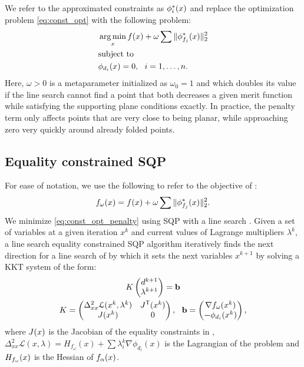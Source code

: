 We refer to the approximated constraints as $\phi^*_i(x)$ and replace the optimization problem \eqref{eq:const_opt} with the following problem:
\begin{equation} \label{eq:const_opt_penalty}
\begin{aligned}
& \operatorname*{arg\,min}_x f(x) + \omega \sum \|\phi^*_{f_j}(x)\|_2^2 \\
& \textrm{subject to} \\
& \phi_{d_i}(x) = 0, \ \  i = 1, \ldots, n. \\ 
\end{aligned}
\end{equation}
Here, $\omega > 0$ is a metaparameter initialized as $\omega_0 = 1$ and which doubles its value if the line search cannot find a point that both decreases a given merit function while satisfying the supporting plane conditions exactly. In practice, the penalty term only affects points that are very close to being planar, while approaching zero very quickly around already folded points.

\subsection{Equality constrained SQP}
For ease of notation, we use the following to refer to the objective of :
\begin{equation}
f_\omega(x) = f(x) + \omega \sum \|\phi^*_{f_j}(x)\|_2^2.
\end{equation}
We minimize \eqref{eq:const_opt_penalty} using SQP with a line search \cite{nocedal}. Given a set of variables at a given iteration $x^k$ and current values of Lagrange multipliers $\lambda^k$, a line search equality constrained SQP algorithm iteratively finds the next direction for a line search of  by which it sets the next variables $x^{k+1}$ by solving a KKT system of the form:
%
\begin{equation} \label{eq:KKT_eps}
\begin{gathered}
{K} \begin{pmatrix} d^{k+1} \\ \lambda^{k+1} \end{pmatrix}=\mathbf{b} \\
{K}=\begin{pmatrix}
{\Delta^2_{xx}\mathcal{L}(x^k,\lambda^k)} & {J^\tr}(\x^k)\\
{J(\x^k)} &  0 \\
\end{pmatrix}, \ \ 
\mathbf{b}=\begin{pmatrix}
{\nabla f_\omega(x^k)} \\ 
-\phi_{d_i}(x^k)\\
\end{pmatrix},
\end{gathered}
\end{equation}
%
where $J(x)$ is the Jacobian of the equality constraints in , $\Delta^2_{xx}\mathcal{L}(x,\lambda) = H_{f_\omega}(x)+\sum\lambda_i^{k} \nabla \phi_{d_i}(x)$ is the Lagrangian of the problem and $H_{f_\omega}(x)$ is the Hessian of $f_\alpha(x)$. 

